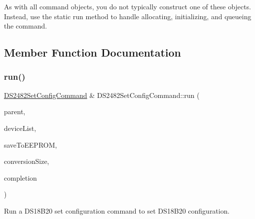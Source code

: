 As with all command objects, you do not typically construct one of these objects. Instead, use the static run method to handle allocating, initializing, and queueing the command. 

\subsection{Member Function Documentation}
\mbox{\label{class_d_s2482_set_config_command_afbf596cbb1c6e8f5d97918aa54946d2f}} 
\subsubsection{\texorpdfstring{run()}{run()}}
{\footnotesize\ttfamily \mbox{\hyperlink{class_d_s2482_set_config_command}{D\+S2482\+Set\+Config\+Command}} \& D\+S2482\+Set\+Config\+Command\+::run (\begin{DoxyParamCaption}\item[{\mbox{\hyperlink{class_d_s2482}{D\+S2482}} \&}]{parent,  }\item[{\mbox{\hyperlink{class_d_s2482_device_list}{D\+S2482\+Device\+List}} \&}]{device\+List,  }\item[{bool}]{save\+To\+E\+E\+P\+R\+OM,  }\item[{int}]{conversion\+Size,  }\item[{std\+::function$<$ void(\mbox{\hyperlink{class_d_s2482_set_config_command}{D\+S2482\+Set\+Config\+Command}} \&, int status)$>$}]{completion }\end{DoxyParamCaption})\hspace{0.3cm}{\ttfamily [static]}}



Run a D\+S18\+B20 set configuration command to set D\+S18\+B20 configuration. 


